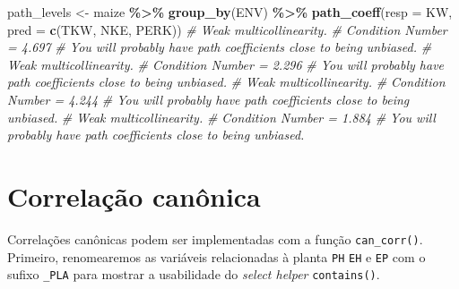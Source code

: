 \documentclass[
]{book}
\makeatletter
\newenvironment{Shaded}{\begin{snugshade}}{\end{snugshade}}
\newcommand{\CommentTok}[1]{\textcolor[rgb]{0.56,0.35,0.01}{\textit{#1}}}
\newcommand{\DataTypeTok}[1]{\textcolor[rgb]{0.13,0.29,0.53}{#1}}
\newcommand{\KeywordTok}[1]{\textcolor[rgb]{0.13,0.29,0.53}{\textbf{#1}}}
\newcommand{\NormalTok}[1]{#1}
\newcommand{\OperatorTok}[1]{\textcolor[rgb]{0.81,0.36,0.00}{\textbf{#1}}}
\newcommand{\StringTok}[1]{\textcolor[rgb]{0.31,0.60,0.02}{#1}}
\numberwithin{equation}{section}
\newcommand{\indf}[1]{\index[function]{#1@\texttt{#1()}|ST}}
\makeatother
\begin{document}
\begin{Shaded}
\begin{Highlighting}[]
\NormalTok{path\_levels \textless{}{-}}\StringTok{ }
\StringTok{  }\NormalTok{maize }\OperatorTok{\%\textgreater{}\%}
\StringTok{  }\KeywordTok{group\_by}\NormalTok{(ENV) }\OperatorTok{\%\textgreater{}\%}
\StringTok{  }\KeywordTok{path\_coeff}\NormalTok{(}\DataTypeTok{resp =}\NormalTok{ KW,}
             \DataTypeTok{pred =} \KeywordTok{c}\NormalTok{(TKW, NKE, PERK))}
\CommentTok{\# Weak multicollinearity. }
\CommentTok{\# Condition Number = 4.697}
\CommentTok{\# You will probably have path coefficients close to being unbiased. }
\CommentTok{\# Weak multicollinearity. }
\CommentTok{\# Condition Number = 2.296}
\CommentTok{\# You will probably have path coefficients close to being unbiased. }
\CommentTok{\# Weak multicollinearity. }
\CommentTok{\# Condition Number = 4.244}
\CommentTok{\# You will probably have path coefficients close to being unbiased. }
\CommentTok{\# Weak multicollinearity. }
\CommentTok{\# Condition Number = 1.884}
\CommentTok{\# You will probably have path coefficients close to being unbiased.}
\end{Highlighting}
\end{Shaded}

\hypertarget{correlauxe7uxe3o-canuxf4nica}{%
\section{Correlação canônica}\label{correlauxe7uxe3o-canuxf4nica}}

Correlações canônicas podem ser implementadas com a função \texttt{can\_corr()}\indf{can\_corr}. Primeiro, renomearemos as variáveis relacionadas à planta \texttt{PH} \texttt{EH} e \texttt{EP} com o sufixo \texttt{\_PLA} para mostrar a usabilidade do \emph{select helper} \texttt{contains()}.
\end{document}
